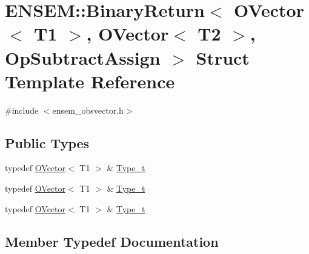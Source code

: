 \hypertarget{structENSEM_1_1BinaryReturn_3_01OVector_3_01T1_01_4_00_01OVector_3_01T2_01_4_00_01OpSubtractAssign_01_4}{}\section{E\+N\+S\+EM\+:\+:Binary\+Return$<$ O\+Vector$<$ T1 $>$, O\+Vector$<$ T2 $>$, Op\+Subtract\+Assign $>$ Struct Template Reference}
\label{structENSEM_1_1BinaryReturn_3_01OVector_3_01T1_01_4_00_01OVector_3_01T2_01_4_00_01OpSubtractAssign_01_4}


{\ttfamily \#include $<$ensem\+\_\+obsvector.\+h$>$}

\subsection*{Public Types}
\begin{DoxyCompactItemize}
\item 
typedef \mbox{\hyperlink{classENSEM_1_1OVector}{O\+Vector}}$<$ T1 $>$ \& \mbox{\hyperlink{structENSEM_1_1BinaryReturn_3_01OVector_3_01T1_01_4_00_01OVector_3_01T2_01_4_00_01OpSubtractAssign_01_4_a5458d7236f7c48041a285b31ba719321}{Type\+\_\+t}}
\item 
typedef \mbox{\hyperlink{classENSEM_1_1OVector}{O\+Vector}}$<$ T1 $>$ \& \mbox{\hyperlink{structENSEM_1_1BinaryReturn_3_01OVector_3_01T1_01_4_00_01OVector_3_01T2_01_4_00_01OpSubtractAssign_01_4_a5458d7236f7c48041a285b31ba719321}{Type\+\_\+t}}
\item 
typedef \mbox{\hyperlink{classENSEM_1_1OVector}{O\+Vector}}$<$ T1 $>$ \& \mbox{\hyperlink{structENSEM_1_1BinaryReturn_3_01OVector_3_01T1_01_4_00_01OVector_3_01T2_01_4_00_01OpSubtractAssign_01_4_a5458d7236f7c48041a285b31ba719321}{Type\+\_\+t}}
\end{DoxyCompactItemize}


\subsection{Member Typedef Documentation}
\mbox{\label{structENSEM_1_1BinaryReturn_3_01OVector_3_01T1_01_4_00_01OVector_3_01T2_01_4_00_01OpSubtractAssign_01_4_a5458d7236f7c48041a285b31ba719321}} 
